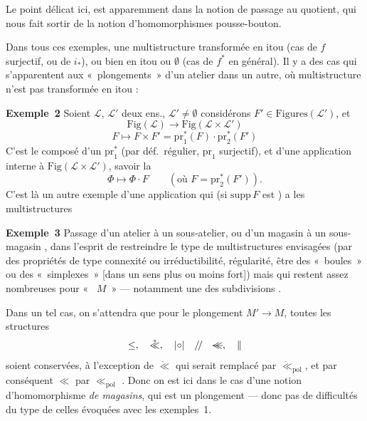 \documentclass[11pt,a4paper]{article}
\begin{document}
Le point délicat ici, est apparemment dans la notion de passage au quotient,
 qui nous fait sortir de la notion
d'homomorphismes pousse-bouton.

Dans tous ces exemples, une multistructure  transformée en
itou (cas de  $f$ surjectif, ou de $i_*$), ou bien en itou ou
$\emptyset$ (cas de $f^*$ en général). Il y a des cas qui s'apparentent aux
«~plongements~» d'un atelier dans un autre, où multistructure n'est
\struck{\ill{}} pas transformée en itou :

\textbf{Exemple~2} Soient $\mathcal{L}$, $\mathcal{L}'$ deux ens.,
$\mathcal{L}' \neq \emptyset$ considérons $F' \in \mathrm{Figures}(\mathcal{L}')$,
 et
\[
\mathrm{Fig}(\mathcal{L}) \longrightarrow \mathrm{Fig}(\mathcal{L} \times \mathcal{L}')
\]
\[
F \longmapsto F \times F' = \mathrm{pr}_1^*(F) \cdot \mathrm{pr}_2^*(F')
\]
C'est le composé d'un $\mathrm{pr}_1^*$ (par déf.\ régulier, $\mathrm{pr}_1$
surjectif), et d'une application interne à $\mathrm{Fig}(\mathcal{L} \times \mathcal{L}')$,
savoir la
\[
\Phi \longmapsto \Phi \cdot F \qquad (\text{où } F = \mathrm{pr}_2^*(F')) .
\]
C'est là un autre exemple d'une application qui (si $\mathrm{supp}\,F$ est
 \ill{}) a \ill{} \ill{} \ill{} \ill{} les \ill{} multistructures
\ill{} \ill{}

\textbf{Exemple~3} Passage d'un atelier à un sous-atelier, ou d'un magasin
 à un sous-magasin , dans l'esprit de restreindre le type de
multistructures envisagées (par des propriétés de type connexité ou
irréductibilité, régularité, être des «~boules~» ou des «~simplexes~» [dans un
sens plus ou moins fort]) mais qui restent assez nombreuses pour
«~  $M$~» — notamment une des \struck{\ill{}}
 subdivisions .

Dans un tel cas,  on s'attendra que pour le plongement
$M' \to M$, toutes les structures
\[
\leq ,\quad \mathring{\ll} ,\quad \mathbin{|{\circ}|} \quad /\!/ \quad \text{\struck{$\ll$}} ,\quad \|
\]
soient conservées, à l'exception  de $\mathring{\ll}$ qui serait
remplacé par $\mathring{\ll}_{\mathrm{pol}}$, et par conséquent $\ll$ par
$\ll_{\mathrm{pol}}$ .
Donc on est ici dans le cas d'une notion d'homomorphisme \emph{de magasins},
qui est un plongement — donc pas de difficultés du type de celles évoquées avec
les exemples~1.
\end{document}
